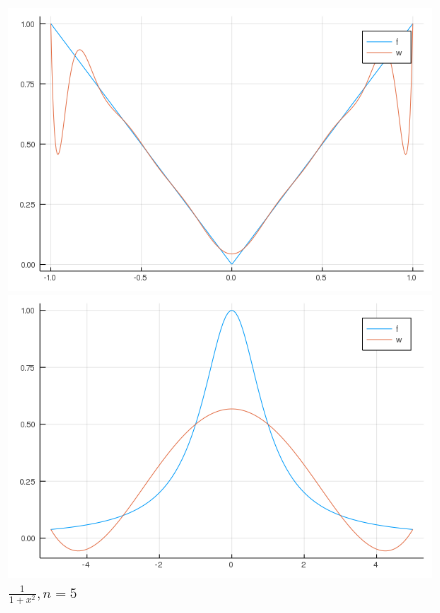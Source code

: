\documentclass[12pt]{article}
\begin{document}
\begin{figure}[!htb]
  \includegraphics[width=\linewidth]{myplot_3_15.png}
  \caption{$|x|, n=15$}
\endminipage\hfill
{}
  \includegraphics[width=\linewidth]{myplot_4_5.png}
  \caption{$\frac{1}{1+x^2}, n=5$}
\endminipage
\end{figure}
\clearpage
\end{document}
